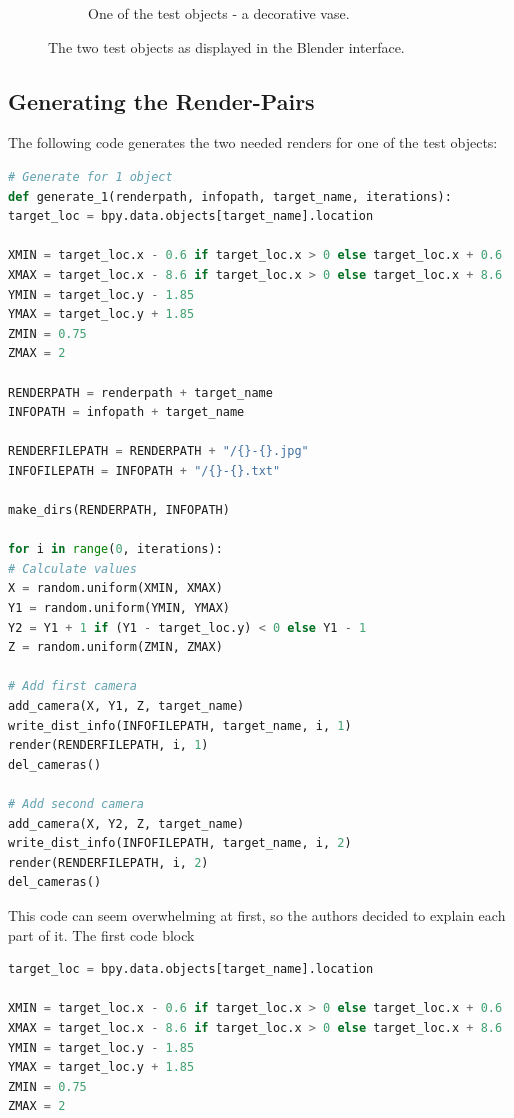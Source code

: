 \begin{figure}[h!]
\begin{subfigure}[t]{0.5\textwidth}
		\caption{One of the test objects - a decorative vase.}
	\end{subfigure}
	\caption{The two test objects as displayed in the Blender interface.}
	\label{pic:implementation_generatingData_testObject}
\end{figure}

\newpage

\subsection{Generating the Render-Pairs}
The following code generates the two needed renders for one of the test objects:

\begin{lstlisting}[language=python]
# Generate for 1 object
def generate_1(renderpath, infopath, target_name, iterations):
target_loc = bpy.data.objects[target_name].location

XMIN = target_loc.x - 0.6 if target_loc.x > 0 else target_loc.x + 0.6
XMAX = target_loc.x - 8.6 if target_loc.x > 0 else target_loc.x + 8.6
YMIN = target_loc.y - 1.85
YMAX = target_loc.y + 1.85
ZMIN = 0.75
ZMAX = 2

RENDERPATH = renderpath + target_name
INFOPATH = infopath + target_name

RENDERFILEPATH = RENDERPATH + "/{}-{}.jpg"
INFOFILEPATH = INFOPATH + "/{}-{}.txt"

make_dirs(RENDERPATH, INFOPATH)

for i in range(0, iterations):
# Calculate values
X = random.uniform(XMIN, XMAX)
Y1 = random.uniform(YMIN, YMAX)
Y2 = Y1 + 1 if (Y1 - target_loc.y) < 0 else Y1 - 1
Z = random.uniform(ZMIN, ZMAX)

# Add first camera
add_camera(X, Y1, Z, target_name)
write_dist_info(INFOFILEPATH, target_name, i, 1)
render(RENDERFILEPATH, i, 1)
del_cameras()

# Add second camera
add_camera(X, Y2, Z, target_name)
write_dist_info(INFOFILEPATH, target_name, i, 2)
render(RENDERFILEPATH, i, 2)
del_cameras()
\end{lstlisting}

This code can seem overwhelming at first, so the authors decided to explain each part of it. The first code block

\begin{lstlisting}[language=python]
target_loc = bpy.data.objects[target_name].location

XMIN = target_loc.x - 0.6 if target_loc.x > 0 else target_loc.x + 0.6
XMAX = target_loc.x - 8.6 if target_loc.x > 0 else target_loc.x + 8.6
YMIN = target_loc.y - 1.85
YMAX = target_loc.y + 1.85
ZMIN = 0.75
ZMAX = 2
\end{lstlisting}

